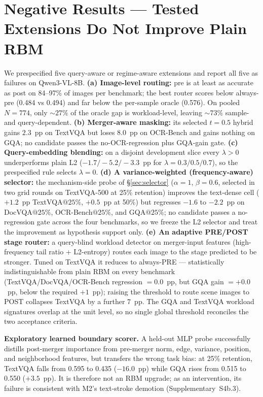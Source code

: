 \documentclass[journal]{IEEEtran}
\begin{document}
\section{Negative Results --- Tested Extensions Do Not Improve Plain RBM}\label{sec:negative}

We prespecified five query-aware or regime-aware extensions and
report all five as failures on Qwen3-VL-8B. \textbf{(a) Image-level routing:}
pre is at least as accurate as post on 84--97\% of images per benchmark; the
best router scores below always-pre (0.484 vs 0.494) and far below the
per-sample oracle (0.576). On pooled $N=774$, only ${\sim}27\%$ of the oracle
gap is workload-level, leaving ${\sim}73\%$ sample- and query-dependent.
\textbf{(b) Merger-aware masking:} its selected $t=0.5$ hybrid gains
$2.3$~pp on TextVQA but loses $8.0$~pp on OCR-Bench and gains nothing on GQA;
no candidate passes the no-OCR-regression plus GQA-gain gate.
\textbf{(c) Query-embedding blending:} on a disjoint development slice every
$\lambda>0$ underperforms plain L2 ($-1.7/-5.2/-3.3$~pp for
$\lambda=0.3/0.5/0.7$), so the prespecified rule selects $\lambda=0$.
\textbf{(d) A variance-weighted (frequency-aware) selector:} the mechanism-side
probe of \S\ref{sec:selector} ($\alpha{=}1$, $\beta{=}0.6$, selected in two grid
rounds on TextVQA-500 at 25\% retention) improves the text-dense cell
($+1.2$~pp TextVQA$@25\%$, $+0.5$~pp at 50\%) but regresses $-1.6$ to
$-2.2$~pp on DocVQA$@25\%$, OCR-Bench$@25\%$, and GQA$@25\%$; no candidate
passes a no-regression gate across the four benchmarks, so we freeze the L2
selector and treat the improvement as hypothesis support only.
\textbf{(e) An adaptive PRE/POST stage router:} a query-blind workload detector
on merger-input features (high-frequency tail ratio + L2-entropy) routes each
image to the stage predicted to be stronger. Tuned on TextVQA it reduces to
always-PRE --- statistically indistinguishable from plain RBM on every
benchmark (TextVQA/DocVQA/OCR-Bench regression $= 0.0$~pp, but GQA gain
$= +0.0$~pp, below the required $+1$~pp); raising the threshold to route
scene images to POST collapses TextVQA by a further $7$~pp. The GQA and TextVQA
workload signatures overlap at the unit level, so no single global threshold
reconciles the two acceptance criteria.

\textbf{Exploratory learned boundary scorer.} A held-out MLP probe successfully
distills post-merger importance from pre-merger norm, edge, variance, position,
and neighborhood features, but transfers the wrong task bias: at 25\%
retention, TextVQA falls from 0.595 to 0.435 ($-16.0$~pp) while GQA rises from
0.515 to 0.550 ($+3.5$~pp). It is therefore not an RBM upgrade; as an
intervention, its failure is consistent with M2's text-stroke demotion
(Supplementary~S4b.3).
\end{document}
